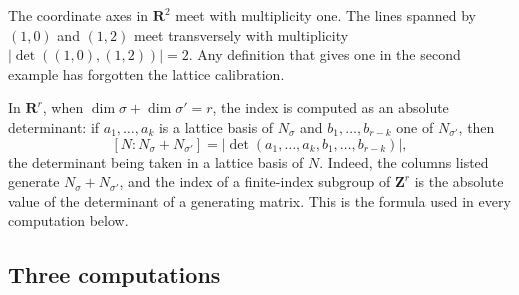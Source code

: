 \begin{example}
\label{ex:ch10-lattice-index-test}
The coordinate axes in $\mathbf R^2$ meet with multiplicity one. The lines
spanned by $(1,0)$ and $(1,2)$ meet transversely with multiplicity
$|\det((1,0),(1,2))|=2$. Any definition that gives one in the second example
has forgotten the lattice calibration.
\end{example}

In $\mathbf R^r$, when $\dim\sigma+\dim\sigma'=r$, the index is computed as an
absolute determinant: if $a_1,\ldots,a_k$ is a lattice basis of $N_\sigma$ and
$b_1,\ldots,b_{r-k}$ one of $N_{\sigma'}$, then
\begin{equation}
\label{eq:ch10-index-determinant}
 [N:N_\sigma+N_{\sigma'}]
 =\bigl|\det(a_1,\ldots,a_k,b_1,\ldots,b_{r-k})\bigr|,
\end{equation}
the determinant being taken in a lattice basis of $N$.  Indeed, the columns
listed generate $N_\sigma+N_{\sigma'}$, and the index of a finite-index
subgroup of $\mathbf Z^r$ is the absolute value of the determinant of a
generating matrix.  This is the formula used in every computation below.

\subsection{Three computations}
\label{sec:ch10-three-computations}

